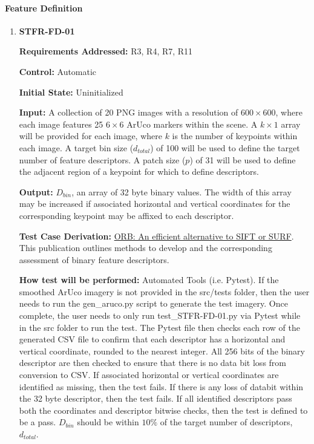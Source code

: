 \documentclass[12pt, titlepage]{article}
\begin{document}
\paragraph{Feature Definition}
\begin{enumerate}
\item \hypertarget{STFR-FD-01}{\textbf{STFR-FD-01}\\}
\textbf{Requirements Addressed:} R3, R4, R7, R11

\textbf{Control:} Automatic

\textbf{Initial State:} Uninitialized

\textbf{Input:} A collection of 20 PNG images with a resolution of $600\times 600$, where each image features 25 $6\times 6$ ArUco markers within the scene. A $k\times 1$ array will be provided for each image, where $k$ is the number of keypoints within each image. A target bin size ($d_{total}$) of 100 will be used to define the target number of feature descriptors. A patch size ($p$) of 31 will be used to define the adjacent region of a keypoint for which to define descriptors.

\textbf{Output:} $D_{bin}$, an array of 32 byte binary values. The width of this array may be increased if associated horizontal and vertical coordinates for the corresponding keypoint may be affixed to each descriptor. 

\textbf{Test Case Derivation:} \href{https://sites.cc.gatech.edu/classes/AY2024/cs4475_summer/images/ORB_an_efficient_alternative_to_SIFT_or_SURF.pdf}
{ORB: An efficient alternative to SIFT or SURF}. This publication outlines methods to develop and the corresponding assessment of binary feature descriptors.

\textbf{How test will be performed:} Automated Tools (i.e. Pytest). If the smoothed ArUco imagery is not provided in the src/tests folder, then the user needs to run the gen\_aruco.py script to generate the test imagery. Once complete, the user needs to only run test\_STFR-FD-01.py via Pytest while in the src folder to run the test. The Pytest file then checks each row of the generated CSV file to confirm that each descriptor has a horizontal and vertical coordinate, rounded to the nearest integer. All 256 bits of the binary descriptor are then checked to ensure that there is no data bit loss from conversion to CSV. If associated horizontal or vertical coordinates are identified as missing, then the test fails. If there is any loss of databit within the 32 byte descriptor, then the test fails. If all identified descriptors pass both the coordinates and descriptor bitwise checks, then the test is defined to be a pass. $D_{bin}$ should be within $10\%$ of the target number of descriptors, $d_{total}$.
\end{enumerate}
\end{document}
